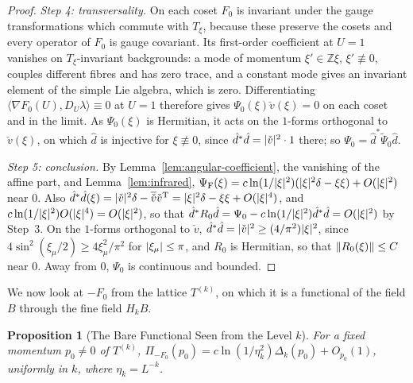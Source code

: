 \documentclass[11pt]{preprint}
\DeclarePairedDelimiter{\abs}{\lvert}{\rvert}
\DeclarePairedDelimiter{\norm}{\lVert}{\rVert}
\numberwithin{equation}{section}
\theoremstyle{definition}
\theoremstyle{remark}
\theoremstyle{plain}
\newtheorem{auxproposition}[lemma]{Proposition}
\begin{document}
\begin{proof}
\emph{Step 4: transversality.} On each coset $F_0$ is invariant under the gauge transformations which commute with $T_\xi$, because these preserve the cosets and every operator of $F_0$ is gauge covariant. Its first-order coefficient at $U = 1$ vanishes on $T_\xi$-invariant backgrounds: a mode of momentum $\xi' \in \mathbb Z\xi$, $\xi' \not\equiv 0$, couples different fibres and has zero trace, and a constant mode gives an invariant element of the simple Lie algebra, which is zero. Differentiating $\langle\nabla F_0(U), D_U\lambda\rangle \equiv 0$ at $U = 1$ therefore gives $\Psi_0(\xi)\check v(\xi) = 0$ on each coset and in the limit. As $\Psi_0(\xi)$ is Hermitian, it acts on the $1$-forms orthogonal to $\check v(\xi)$, on which $\hat d$ is injective for $\xi \not\equiv 0$, since $\hat d^*\hat d = \abs{\check v}^2\cdot 1$ there; so $\Psi_0 = \hat d^*\tilde\Psi_0\hat d$.

\emph{Step 5: conclusion.} By Lemma~\ref{lem:angular-coefficient}, the vanishing of the affine part, and Lemma~\ref{lem:infrared}, $\Psi_{\mathrm F}(\xi) = c\ln(1/\abs{\xi}^2)(\abs{\xi}^2\delta - \xi\xi) + O(\abs{\xi}^2)$ near $0$. Also $\hat d^*\hat d(\xi) = \abs{\check v}^2\delta - \overline{\check v}\check v^{\mathrm T} = \abs{\xi}^2\delta - \xi\xi + O(\abs{\xi}^4)$, and $c\ln(1/\abs{\xi}^2)O(\abs{\xi}^4) = O(\abs{\xi}^2)$, so that $\hat d^*R_0\hat d = \Psi_0 - c\ln(1/\abs{\xi}^2)\hat d^*\hat d = O(\abs{\xi}^2)$ by Step~3. On the $1$-forms orthogonal to $\check v$, $\hat d^*\hat d = \abs{\check v}^2 \geq (4/\pi^2)\abs{\xi}^2$, since $4\sin^2(\xi_\mu/2) \geq 4\xi_\mu^2/\pi^2$ for $\abs{\xi_\mu} \leq \pi$, and $R_0$ is Hermitian, so that $\norm{R_0(\xi)} \leq C$ near $0$. Away from $0$, $\Psi_0$ is continuous and bounded.
\end{proof}

We now look at $-F_0$ from the lattice $T^{(k)}$, on which it is a functional of the field $B$ through the fine field $H_kB$.

\begin{auxproposition}[The Bare Functional Seen from the Level $k$]\label{prop:bare-from-top}
For a fixed momentum $p_0 \neq 0$ of $T^{(k)}$, $\Pi_{-F_0}(p_0) = c\ln(1/\eta_k^2)\Delta_k(p_0) + O_{p_0}(1)$, uniformly in $k$, where $\eta_k = L^{-k}$.
\end{auxproposition}
\end{document}
